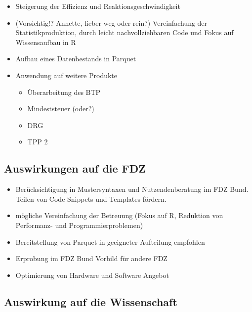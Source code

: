 \documentclass[
  german,
  10pt,
  twoside]{article}
\providecommand{\tightlist}{%
  \setlength{\itemsep}{0pt}\setlength{\parskip}{0pt}}
\begin{document}
\begin{itemize}
\tightlist
\item
  Steigerung der Effizienz und Reaktionsgeschwindigkeit
\item
  (Vorsichtig!? Annette, lieber weg oder rein?) Vereinfachung der
  Statistikproduktion, durch leicht nachvollziehbaren Code und Fokus auf
  Wissensaufbau in R
\item
  Aufbau eines Datenbestands in Parquet
\item
  Anwendung auf weitere Produkte

  \begin{itemize}
  \tightlist
  \item
    Überarbeitung des BTP
  \item
    Mindeststeuer (oder?)
  \item
    DRG
  \item
    TPP 2
  \end{itemize}
\end{itemize}

\subsection{Auswirkungen auf die FDZ}\label{auswirkungen-auf-die-fdz}

\begin{itemize}
\tightlist
\item
  Berücksichtigung in Mustersyntaxen und Nutzendenberatung im FDZ Bund.
  Teilen von Code-Snippets und Templates fördern.
\item
  mögliche Vereinfachung der Betreuung (Fokus auf R, Reduktion von
  Performanz- und Programmierproblemen)
\item
  Bereitstellung von Parquet in geeigneter Aufteilung empfohlen
\item
  Erprobung im FDZ Bund Vorbild für andere FDZ
\item
  Optimierung von Hardware und Software Angebot
\end{itemize}

\subsection{Auswirkung auf die
Wissenschaft}\label{auswirkung-auf-die-wissenschaft}
\end{document}

